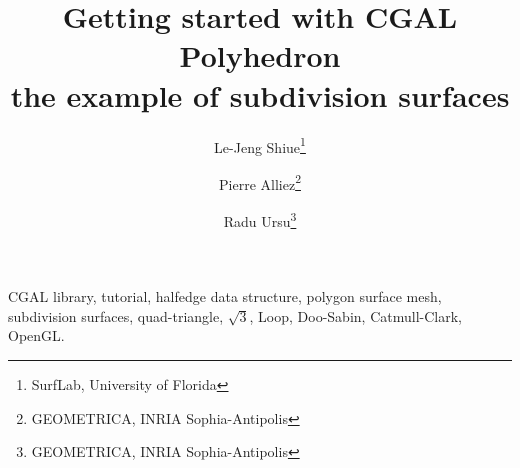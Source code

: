 \documentclass[letter,twoside,10pt]{article}
\begin{document}
\date{}
\title{{\LARGE {\sffamily\bfseries Getting started with CGAL
Polyhedron}}\\ the example of subdivision surfaces}
\author{\small
\sffamily Le-Jeng Shiue\footnote{SurfLab, University of Florida}
\and \small
\sffamily Pierre Alliez\footnote{GEOMETRICA, INRIA Sophia-Antipolis}
\and \small
\sffamily Radu Ursu\footnote{GEOMETRICA, INRIA Sophia-Antipolis}}
\maketitle

\thispagestyle{empty}

\abstract{
}

\vskip 3mm

                 CGAL library,
                 tutorial,
                 halfedge data structure, 
                 polygon surface mesh,
                 subdivision surfaces,
                 quad-triangle,
                 $\sqrt{3}$,
                 Loop,
                 Doo-Sabin,
                 Catmull-Clark,
                 OpenGL.
\end{document}
